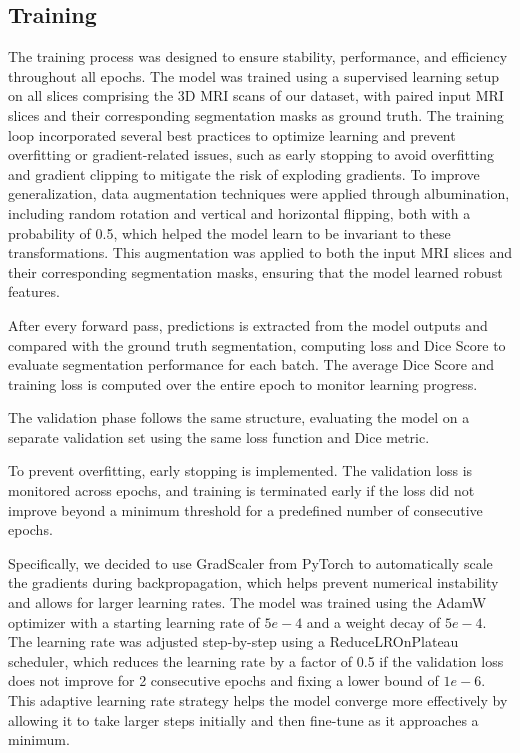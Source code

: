 \documentclass[10pt,twocolumn,letterpaper]{article}
\begin{document}
\subsection{Training}
The training process was designed to ensure stability, performance, and efficiency throughout all epochs. The model was trained using a supervised learning setup on all slices comprising the 3D MRI scans of our dataset, with paired input MRI slices and their corresponding segmentation masks as ground truth. The training loop incorporated several best practices to optimize learning and prevent overfitting or gradient-related issues, such as early stopping to avoid overfitting and gradient clipping to mitigate the risk of exploding gradients. To improve generalization, data augmentation techniques were applied through albumination, including random rotation and vertical and horizontal flipping, both with a probability of 0.5, which helped the model learn to be invariant to these transformations. This augmentation was applied to both the input MRI slices and their corresponding segmentation masks, ensuring that the model learned robust features.

After every forward pass, predictions is extracted from the model outputs and compared with the ground truth segmentation, computing loss and Dice Score to evaluate segmentation performance for each batch. The average Dice Score and training loss is computed over the entire epoch to monitor learning progress.

The validation phase follows the same structure, evaluating the model on a separate validation set using the same loss function and Dice metric.

To prevent overfitting, early stopping is implemented. The validation loss is monitored across epochs, and training is terminated early if the loss did not improve beyond a minimum threshold for a predefined number of consecutive epochs.

Specifically, we decided to use GradScaler from PyTorch to automatically scale the gradients during backpropagation, which helps prevent numerical instability and allows for larger learning rates. The model was trained using the AdamW optimizer with a starting learning rate of $5e-4$ and a weight decay of $5e-4$. The learning rate was adjusted step-by-step using a ReduceLROnPlateau scheduler, which reduces the learning rate by a factor of 0.5 if the validation loss does not improve for 2 consecutive epochs and fixing a lower bound of $1e-6$. This adaptive learning rate strategy helps the model converge more effectively by allowing it to take larger steps initially and then fine-tune as it approaches a minimum.
\end{document}
